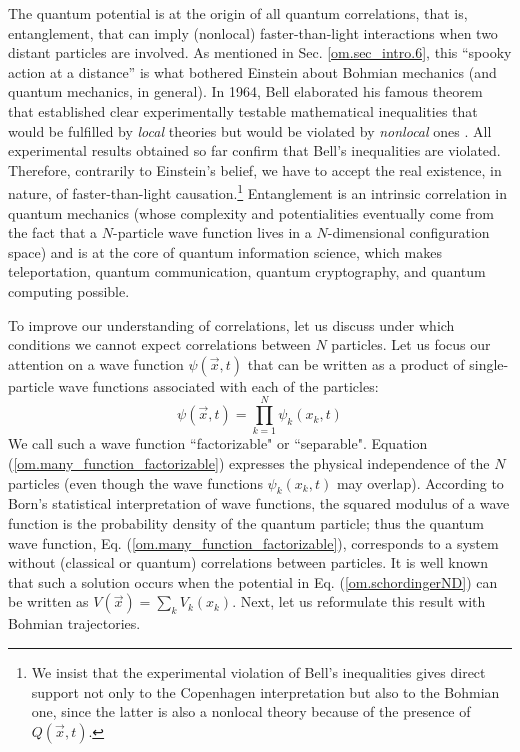 \documentclass[nofootinbib, secnumarabic, amsmath, nobibnotes,10pt,aps,pra]{revtex4-1}
\newcommand{\sref}[1]{Sec. \ref{#1}}
\newcommand{\eref}[1]{Eq. (\ref{#1})}
\newcommand{\Eref}[1]{Equation (\ref{#1})}
\begin{document}
The quantum potential is at the origin of all quantum correlations,
that is, entanglement, that can imply (nonlocal) faster-than-light
interactions when two distant particles are involved. As mentioned
in \sref{om.sec_intro.6}, this ``spooky action at a distance'' is
what bothered Einstein about Bohmian mechanics (and quantum
mechanics, in general). In 1964, Bell elaborated his famous theorem
that established clear experimentally testable mathematical
inequalities that would be fulfilled by \textit{local} theories but
would be violated by \textit{nonlocal} ones
\cite{om.Bell1964}. All experimental results obtained so far confirm
that Bell's inequalities are violated. Therefore, contrarily to
Einstein's belief, we have to accept the real existence, in nature,
of faster-than-light causation.\footnote{We insist that the
experimental violation of Bell's inequalities gives direct support
not only to the Copenhagen interpretation but also to the Bohmian
one, since the latter is also a nonlocal theory because of the presence of
$Q(\vec{x},t)$.} Entanglement is an intrinsic correlation in
quantum mechanics (whose complexity and potentialities eventually
come from the fact that a $N$-particle wave function lives in a
$N$-dimensional configuration space) and is at the core of quantum
information science, which makes teleportation, quantum
communication, quantum cryptography, and quantum computing possible.

To improve our understanding of correlations, let us discuss under
which conditions we cannot expect correlations between $N$ particles. Let us focus our attention on a
wave function $\psi(\vec{x},t)$ that can be written as a product of
single-particle wave functions associated with each of the
particles:
\begin{equation}
\label{om.many_function_factorizable}
\psi(\vec{x},t) = \prod_{k = 1}^N \psi_k(x_k,t)
\end{equation}
We call such a wave function ``factorizable" or ``separable". \Eref{om.many_function_factorizable} expresses the physical independence of the $N$ particles (even though the wave functions $\psi_k(x_k,t)$ may overlap). According to Born's statistical interpretation of wave functions, the squared modulus of a wave function is the probability density of the quantum particle; thus the quantum wave function, \eref{om.many_function_factorizable}, corresponds to a system without (classical or quantum) correlations between particles. It is well known that such a solution occurs when the potential in \eref{om.schordingerND} can be written as $V(\vec{x}) = \sum_k V_k(x_k)$. Next, let us reformulate this result with Bohmian trajectories.
\end{document}

